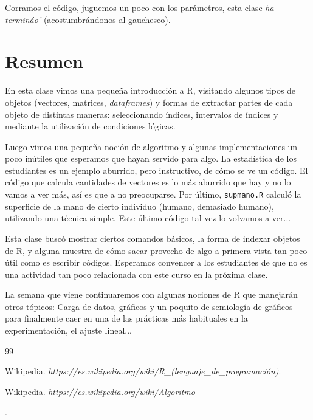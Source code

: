 \documentclass[11pt,a4paper]{article}
\begin{document}
Corramos el código, juguemos un poco con los parámetros, esta clase \textit{ha termináo'} (acostumbrándonos al gauchesco).

\section*{Resumen}
En esta clase vimos una pequeña introducción a R, visitando algunos tipos de objetos (vectores, matrices, \textit{dataframes}) y formas de extractar partes de cada objeto de distintas maneras: seleccionando índices, intervalos de índices y mediante la utilización de condiciones lógicas. 

Luego vimos una pequeña noción de algoritmo y algunas implementaciones un poco inútiles que esperamos que hayan servido para algo. La estadística de los estudiantes es un ejemplo aburrido, pero instructivo, de cómo se ve un código. El código que calcula cantidades de vectores es lo más aburrido que hay y no lo vamos a ver más, así es que a no preocuparse. Por último, \texttt{supmano.R} calculó la superficie de la mano de cierto individuo (humano, demasiado humano), utilizando una técnica simple. Este último código tal vez lo volvamos a ver...

Esta clase buscó mostrar ciertos comandos básicos, la forma de indexar objetos de R, y alguna muestra de cómo sacar provecho de algo a primera vista tan poco útil como es escribir códigos. Esperamos convencer a los estudiantes de que no es una actividad tan poco relacionada con este curso en la próxima clase.

La semana que viene continuaremos con algunas nociones de R que manejarán otros tópicos: Carga de datos, gráficos y un poquito de semiología de gráficos para finalmente caer en una de las prácticas más habituales en la experimentación, el ajuste lineal... 
\begin{thebibliography}{99}

 Wikipedia. \textit{https://es.wikipedia.org/wiki/R\_(lenguaje\_de\_programación)}.

 Wikipedia. \textit{https://es.wikipedia.org/wiki/Algoritmo}

\end{thebibliography}.
\end{document}
